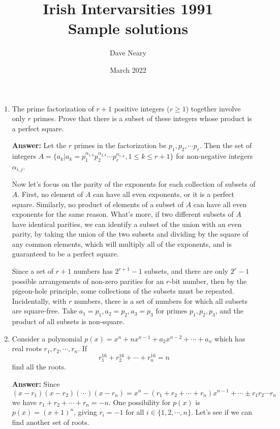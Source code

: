 \documentclass{article}
\title{Irish Intervarsities 1991 \\ Sample solutions}
\author{Dave Neary}
\date{March 2022}
\begin{document}
\maketitle

\begin{enumerate}
    \item The prime factorization of $r+1$ positive integers ($r \geq 1$) together involve only $r$ primes. Prove that there is a subset of these integers whose product is a perfect square.
    
    \textbf{Answer:} Let the $r$ primes in the factorization be $p_1, p_2, \cdots p_r$. Then the set of integers $A = \{a_k | a_k = p_1^{\alpha_{1,k}}p_2^{\alpha_{2,k}}\cdots p_r^{\alpha_{r,k}}, 1\leq k \leq r+1\}$ for non-negative integers $\alpha_{i,j}$.
    
    Now let's focus on the parity of the exponents for each collection of subsets of $A$. First, no element of $A$ can have all even exponents, or it is a perfect square. Similarly, no product of elements of a subset of $A$ can have all even exponents for the same reason. What's more, if two different subsets of $A$ have identical parities, we can identify a subset of the union with an even parity, by taking the union of the two subsets and dividing by the square of any common elements, which will multiply all of the exponents, and is guaranteed to be a perfect square.
    
    Since a set of $r+1$ numbers has $2^{r+1}-1$ subsets, and there are only $2^r-1$ possible arrangements of non-zero parities for an $r$-bit number, then by the pigeon-hole principle, some collections of the subsets must be repeated. Incidentally, with $r$ numbers, there is a set of numbers for which all subsets are square-free. Take $a_1=p_1, a_2=p_2, a_3=p_3$ for primes $p_1, p_2, p_3$, and the product of all  subsets is non-square.
    
    \item Consider a polynomial $p(x) = x^n + nx^{n-1} + a_2x^{n-2} + \cdots + a_n$ which has real roots $r_1, r_2, \cdots, r_n$. If
    \[ r_1^{16} + r_2^{16} + \cdots + r_n^{16} = n \]
    find all the roots.
    
    \textbf{Answer:} Since
    \[ (x-r_1)(x-r_2)(\cdots)(x-r_n) = x^n-(r_1+r_2+\cdots+r_n)x^{n-1} + \cdots \pm r_1r_2\cdots r_n \]
    we have $r_1 + r_2 + \cdots + r_n = -n$. One possibility for $p(x)$ is $p(x) = (x+1)^{n}$, giving $r_i = -1$ for all $i \in \{1, 2, \cdots, n\}$. Let's see if we can find another set of roots.
    

\end{enumerate}
\end{document}
